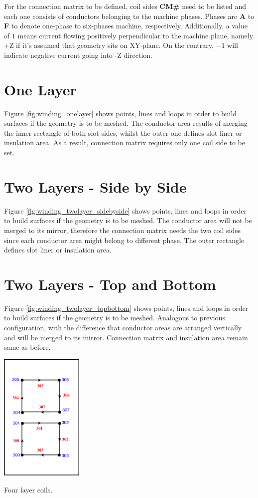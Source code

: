 \documentclass[justified]{tufte-book} %
\begin{document}
For the connection matrix to be defined, coil sides \textbf{CM\#} need to be listed and each one consists of conductors belonging to the machine phases. Phases are \textbf{A} to  \textbf{F} to denote one-phase to six-phases machine, respectively. Additionally, a value of $1$ means current flowing positively perpendicular to the machine plane, namely +Z if it's assumed that geometry sits on XY-plane. On the contrary, $-1$ will indicate negative current going into -Z direction.   
 
\section[One Layer]{One Layer}
Figure \ref{fig:winding_onelayer} shows points, lines and loops in order to build surfaces if the geometry is to be meshed. The conductor area results of merging the inner rectangle of both slot sides, whilst the outer one defines slot liner or insulation area. As a result, connection matrix requires only one coil side to be set.

\section[Two Layers - Side by Side]{Two Layers - Side by Side}
Figure \ref{fig:winding_twolayer_sidebyside} shows points, lines and loops in order to build surfaces if the geometry is to be meshed. The conductor area will not be merged to its mirror, therefore the connection matrix needs the two coil sides since each conductor area might belong to different phase. The outer rectangle defines slot liner or insulation area.

\section[Two Layers - Top and Bottom]{Two Layers - Top and Bottom}
Figure \ref{fig:winding_twolayer_topbottom} shows points, lines and loops in order to build surfaces if the geometry is to be meshed. Analogous to previous configuration, with the difference that conductor areas are arranged vertically and will be merged to its mirror. Connection matrix and insulation area remain same as before.

\begin{marginfigure}
\includegraphics[width=4cm]{winding_fourlayer.pdf}
\caption{Four layer coils.}
\label{fig:winding_fourlayer}
\end{marginfigure}
\end{document}
